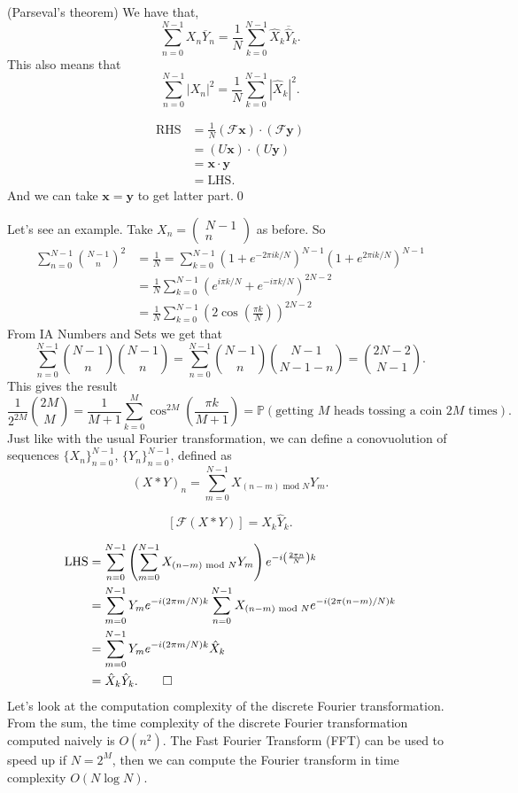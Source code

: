 \documentclass{article}
\begin{document}
\begin{proposition}
	(Parseval's theorem) We have that,
	\[
		\sum_{n=0}^{N-1}X_n\overline Y_n=\frac 1N\sum_{k=0}^{N-1} \hat X_k\overline{\hat Y}_k.
	\]
	This also means that
	\[
		\sum_{n=0}^{N-1}|X_n|^2=\frac 1N\sum_{k=0}^{N-1}|\hat X_k|^2.
	\]
\end{proposition}
\pf
\begin{align*}
	\text{RHS} &= \frac 1N(\mathcal F\mathbf x)\cdot(\mathcal F\mathbf y)\\
		   &= (U\mathbf x)\cdot(U\mathbf y)\\
		   &=\mathbf x\cdot \mathbf y\\
		   &= \text{LHS}.
\end{align*}
And we can take $ \mathbf x=\mathbf y $ to get latter part.\qed
\par
Let's see an example. Take $ X_n=\begin{pmatrix}
  N-1 \\ n
\end{pmatrix} $ as before. So
\begin{align*}
	\sum_{n=0}^{N-1}\binom{N-1}{n}^2 &=\frac 1N=\sum_{k=0}^{N-1}(1+e^{-2\pi ik/N})^{N-1}(1+e^{2\pi ik/N})^{N-1}\\
					 &=\frac 1N\sum_{k=0}^{N-1}(e^{i\pi k/N}+e^{-i\pi k/N})^{2N-2}\\
					 &=\frac 1N \sum_{k=0}^{N-1}\left(2\cos\left(\frac{\pi k}N\right)\right)^{2N-2}
\end{align*}
From IA Numbers and Sets we get that
\[
	\sum_{n=0}^{N-1}\binom{N-1}n\binom{N-1}n=\sum_{n=0}^{N-1}\binom{N-1}n\binom{N-1}{N-1-n}=\binom{2N-2}{N-1}.
\]
This gives the result
\[
\frac 1{2^{2M}}\binom{2M}M=\frac 1{M+1}\sum_{k=0}^M\cos^{2M}\left(\frac{\pi k}{M+1}\right)=\mathbb P(\text{getting } M \text{ heads tossing a coin } 2M \text{ times}).
\]
Just like with the usual Fourier transformation, we can define a conovuolution of sequences $ \{X_n\}_{n=0}^{N-1} $, $ \{Y_n\}_{n=0}^{N-1} $, defined as
\[
	(X*Y)_n=\sum_{m=0}^{N-1}X_{(n-m)\text{ mod } N}Y_m.
\]
\begin{proposition}
  \[
	  [\mathcal F(X*Y)]=\hat X_k\hat Y_k.
  \]
\end{proposition}
\pf
\begin{align*}
	\text{LHS} &= \sum_{n=0}^{N-1}\left(\sum_{m=0}^{N-1}X_{(n-m)\text{ mod } N} Y_m\right)e^{-i\left(\frac{2\pi n}N\right)k}\\
		   &= \sum_{m=0}^{N-1}Y_me^{-i(2\pi m/N)k}\sum_{n=0}^{N-1}X_{(n-m)\text{ mod } N}e^{-i(2\pi(n-m)/N)k}\\
		   &=\sum_{m=0}^{N-1} Y_me^{-i(2\pi m/N)k} \hat X_k\\
		   &=\hat X_k\hat Y_k.\qed
\end{align*}
Let's look at the computation complexity of the discrete Fourier transformation. From the sum, the time complexity of the discrete Fourier transformation computed naively is $ O(n^2) $. The Fast Fourier Transform (FFT) can be used to speed up if $ N=2^M $, then we can compute the Fourier transform in time complexity $ O(N\log N) $.
\end{document}

